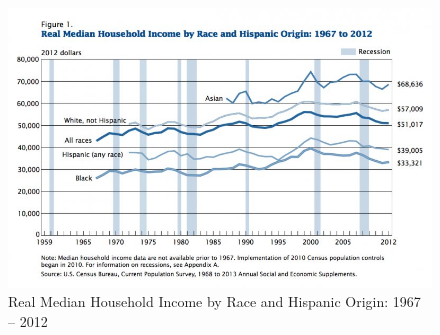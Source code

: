 {\begin{figure}[h!]
\centering
\includegraphics[width=14cm]{figures/Household_Income.png}
\caption[Real Median Household Income]{Real Median Household Income by Race and Hispanic Origin: 1967 -- 2012}
\label{fig:income}
\end{figure}

}
